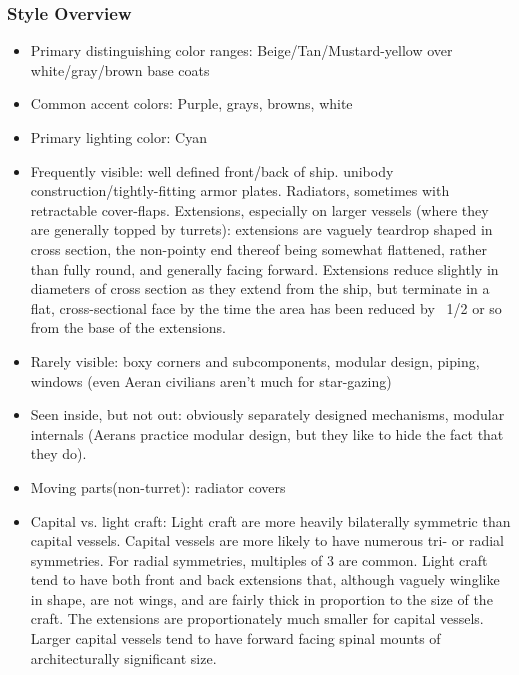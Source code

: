 \subsubsection{Style Overview}
\begin{itemize}

\item Primary distinguishing color ranges: Beige/Tan/Mustard-yellow
over white/gray/brown base coats

\item Common accent colors: Purple, grays, browns, white

\item Primary lighting color: Cyan

\item Frequently visible: well defined front/back of ship. unibody
construction/tightly-fitting armor plates. Radiators, sometimes with
retractable cover-flaps. Extensions, especially on larger vessels
(where they are generally topped by turrets): extensions are vaguely
teardrop shaped in cross section, the non-pointy end thereof being
somewhat flattened, rather than fully round, and generally facing
forward. Extensions reduce slightly in diameters of cross section as
they extend from the ship, but terminate in a flat, cross-sectional
face by the time the area has been reduced by ~1/2 or so from the base
of the extensions.

\item Rarely visible: boxy corners and subcomponents, modular design,
piping, windows (even Aeran civilians aren't much for star-gazing)

\item Seen inside, but not out: obviously separately designed
mechanisms, modular internals (Aerans practice modular design, but
they like to hide the fact that they do).

\item Moving parts(non-turret): radiator covers

\item Capital vs. light craft: Light craft are more heavily
bilaterally symmetric than capital vessels. Capital vessels are more
likely to have numerous tri- or radial symmetries. For radial
symmetries, multiples of 3 are common. Light craft tend to have both
front and back extensions that, although vaguely winglike in shape,
are not wings, and are fairly thick in proportion to the size of the
craft. The extensions are proportionately much smaller for capital
vessels. Larger capital vessels tend to have forward facing spinal
mounts of architecturally significant size.
\end{itemize}

